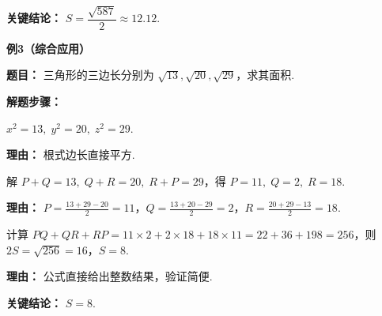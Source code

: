 \begin{examplebox}
\textbf{\textcolor{CExample}{关键结论：}} \textbf{$S = \dfrac{\sqrt{587}}{2}\approx 12.12$}.

\medskip
\textbf{\textcolor{CExample}{例3（综合应用）}}

\textbf{\textcolor{CExample}{题目：}} 三角形的三边长分别为 $\sqrt{13},\sqrt{20},\sqrt{29}$，求其面积.

\textbf{\textcolor{CExample}{解题步骤：}}
\begin{description}[style=nextline, leftmargin=2.8em, labelsep=0.5em, itemsep=0.45em]
    \item[\textbf{第一步（取平方）：}] $x^2=13,\;y^2=20,\;z^2=29$.
    \par\textbf{理由：} 根式边长直接平方.
    \item[\textbf{第二步（解辅助量）：}] 解 $P+Q=13,\;Q+R=20,\;R+P=29$，得 $P=11,\;Q=2,\;R=18$.
    \par\textbf{理由：} $P = \frac{13+29-20}{2}=11$，$Q = \frac{13+20-29}{2}=2$，$R = \frac{20+29-13}{2}=18$.
    \item[\textbf{第三步（代入公式）：}] 计算 $PQ+QR+RP = 11\times2 + 2\times18 + 18\times11 = 22+36+198 = 256$，则 $2S = \sqrt{256}=16$，$S=8$.
    \par\textbf{理由：} 公式直接给出整数结果，验证简便.
\end{description}

\textbf{\textcolor{CExample}{关键结论：}} \textbf{$S=8$}.

\end{examplebox}
